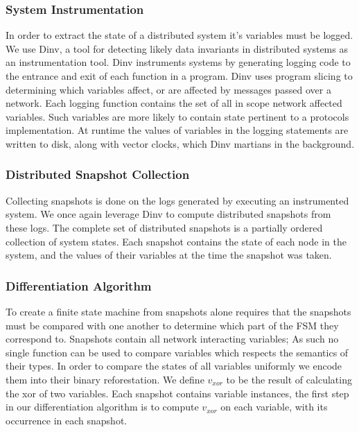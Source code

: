 \subsubsection{System Instrumentation}

In order to extract the state of a distributed system it's variables must be
logged. We use Dinv, a tool for detecting likely data invariants in distributed
systems as an instrumentation tool. Dinv instruments systems by generating
logging code to the entrance and exit of each function in a program. Dinv uses
program slicing to determining which variables affect, or are affected by
messages passed over a network. Each logging function contains the set of all
in scope network affected variables. Such variables are more likely to contain
state pertinent to a protocols implementation. At runtime the values of
variables in the logging statements are written to disk, along with vector
clocks, which Dinv martians in the background.

\subsubsection{Distributed Snapshot Collection}

Collecting snapshots is done on the logs generated by executing an instrumented
system. We once again leverage Dinv to compute distributed snapshots from these
logs. The complete set of distributed snapshots is a partially ordered
collection of system states. Each snapshot contains the state of each node in
the system, and the values of their variables at the time the snapshot was
taken.

\subsubsection{Differentiation Algorithm}
\label{differentiation-algorithm}

To create a finite state machine from snapshots alone requires that the
snapshots must be compared with one another to determine which part of the FSM
they correspond to. Snapshots contain all network interacting variables; As
such no single function can be used to compare variables which respects the
semantics of their types. In order to compare the states of all variables
uniformly we encode them into their binary reforestation. We define $v_{xor}$ to
be the result of calculating the xor of two variables. Each snapshot contains
variable instances, the first step in our differentiation algorithm is to
compute $v_{xor}$ on each variable, with its occurrence in each snapshot.


